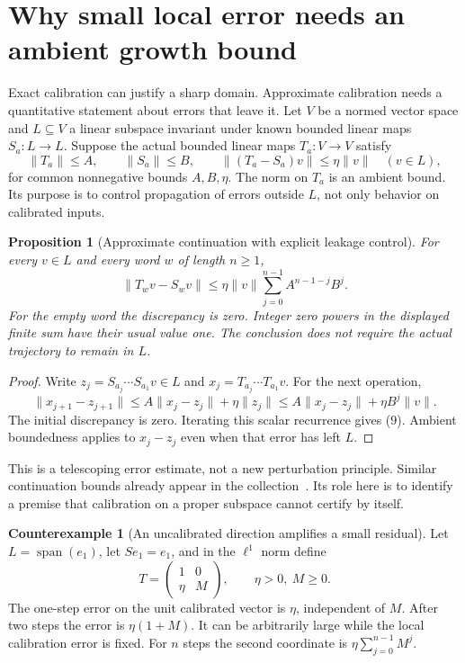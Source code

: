 \documentclass[11pt,letterpaper]{article}
\theoremstyle{plain}
\newtheorem{proposition}[theorem]{Proposition}
\theoremstyle{definition}
\newtheorem{counterexample}[theorem]{Counterexample}
\newcommand{\Span}{\operatorname{span}}\newcommand{\Pow}{\mathcal P}
\begin{document}
\section{Why small local error needs an ambient growth bound}\label{sec:approx}
Exact calibration can justify a sharp domain. Approximate calibration needs a quantitative statement about errors that leave it. Let $V$ be a normed vector space and $L\subseteq V$ a linear subspace invariant under known bounded linear maps $S_a:L\to L$. Suppose the actual bounded linear maps $T_a:V\to V$ satisfy
\[
\|T_a\|\le A,\qquad \|S_a\|\le B,\qquad
\|(T_a-S_a)v\|\le\eta\|v\|\quad(v\in L),\tag{8}
\]
for common nonnegative bounds $A,B,\eta$. The norm on $T_a$ is an ambient bound. Its purpose is to control propagation of errors outside $L$, not only behavior on calibrated inputs.

\begin{proposition}[Approximate continuation with explicit leakage control]\label{prop:approx}
For every $v\in L$ and every word $w$ of length $n\ge1$,
\[
\|T_wv-S_wv\|
\le\eta\|v\|\sum_{j=0}^{n-1}A^{n-1-j}B^j.\tag{9}
\]
For the empty word the discrepancy is zero. Integer zero powers in the displayed finite sum have their usual value one. The conclusion does not require the actual trajectory to remain in $L$.
\end{proposition}
\begin{proof}
Write $z_j=S_{a_j}\cdots S_{a_1}v\in L$ and $x_j=T_{a_j}\cdots T_{a_1}v$. For the next operation,
\[
\|x_{j+1}-z_{j+1}\|
\le A\|x_j-z_j\|+\eta\|z_j\|
\le A\|x_j-z_j\|+\eta B^j\|v\|.
\]
The initial discrepancy is zero. Iterating this scalar recurrence gives (9). Ambient boundedness applies to $x_j-z_j$ even when that error has left $L$.
\end{proof}

This is a telescoping error estimate, not a new perturbation principle. Similar continuation bounds already appear in the collection~\cite{understanding,resolution}. Its role here is to identify a premise that calibration on a proper subspace cannot certify by itself.

\begin{counterexample}[An uncalibrated direction amplifies a small residual]\label{ce:growth}
Let $L=\Span(e_1)$, let $Se_1=e_1$, and in the $\ell^1$ norm define
\[
T=\begin{pmatrix}1&0\\ \eta&M\end{pmatrix},\qquad \eta>0,\ M\ge0.
\]
The one-step error on the unit calibrated vector is $\eta$, independent of $M$. After two steps the error is $\eta(1+M)$. It can be arbitrarily large while the local calibration error is fixed. For $n$ steps the second coordinate is $\eta\sum_{j=0}^{n-1}M^j$.
\end{counterexample}
\end{document}
